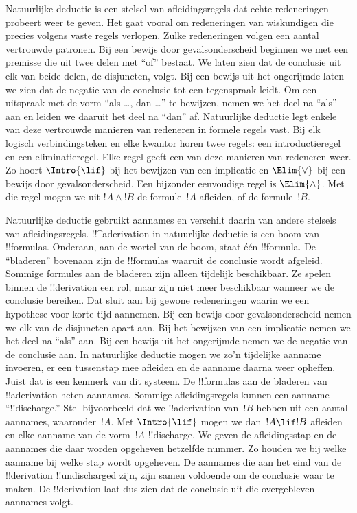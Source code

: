 \documentclass[../../../include/open-logic-section]{subfiles}
\begin{document}
      {}
      {}


Natuurlijke deductie is een stelsel van afleidingsregels dat echte
redeneringen probeert weer te geven. Het gaat vooral om redeneringen
van wiskundigen die precies volgens vaste regels verlopen. Zulke
redeneringen volgen een aantal vertrouwde patronen. Bij een bewijs door
gevalsonderscheid beginnen we met een premisse die uit twee delen met
``of'' bestaat. We laten zien dat de conclusie uit elk van beide delen,
de disjuncten, volgt. Bij een bewijs uit het ongerijmde laten we zien
dat de negatie van de conclusie tot een tegenspraak leidt. Om een
uitspraak met de vorm ``als \dots, dan \dots'' te bewijzen, nemen we
het deel na ``als'' aan en leiden we daaruit het deel na ``dan'' af.
Natuurlijke deductie legt enkele van deze vertrouwde manieren van
redeneren in formele regels vast. Bij elk logisch verbindingsteken en
elke kwantor horen twee regels: een introductieregel en een
eliminatieregel. Elke regel geeft een van deze manieren van
redeneren weer. Zo hoort $\Intro{\lif}$ bij het bewijzen van een
implicatie en $\Elim{\lor}$ bij een bewijs door gevalsonderscheid. Een
bijzonder eenvoudige regel is $\Elim{\land}$. Met die regel mogen we
uit $!A \land !B$ de formule~$!A$ afleiden, of de formule~$!B$.

Natuurlijke deductie gebruikt aannames en verschilt daarin van andere
stelsels van afleidingsregels. !!^a{derivation} in natuurlijke deductie
is een boom van !!{formula}s. Onderaan, aan de wortel van de boom,
staat één !!{formula}. De ``bladeren'' bovenaan zijn de !!{formula}s
waaruit de conclusie wordt afgeleid. Sommige formules aan de bladeren
zijn alleen tijdelijk beschikbaar. Ze spelen binnen de !!{derivation}
een rol, maar zijn niet meer beschikbaar wanneer we de conclusie
bereiken. Dat sluit aan bij gewone redeneringen waarin we een hypothese
voor korte tijd aannemen. Bij een bewijs door gevalsonderscheid nemen
we elk van de disjuncten apart aan. Bij het bewijzen van een
implicatie nemen we het deel na ``als'' aan. Bij een bewijs uit het
ongerijmde nemen we de negatie van de conclusie aan. In natuurlijke
deductie mogen we zo'n tijdelijke aanname invoeren, er een tussenstap
mee afleiden en de aanname daarna weer opheffen. Juist dat is een
kenmerk van dit systeem. De !!{formula}s aan de bladeren van
!!a{derivation} heten aannames. Sommige afleidingsregels kunnen een
aanname ``!!{discharge}.'' Stel bijvoorbeeld dat we !!a{derivation}
van~$!B$ hebben uit een aantal aannames, waaronder~$!A$. Met
$\Intro{\lif}$ mogen we dan~$!A \lif !B$ afleiden en elke aanname van
de vorm~$!A$ !!{discharge}. We geven de afleidingsstap en de aannames
die daar worden opgeheven hetzelfde nummer. Zo houden we bij welke
aanname bij welke stap wordt opgeheven. De aannames die aan het eind
van de !!{derivation} !!{undischarged} zijn, zijn samen voldoende om
de conclusie waar te maken. De !!{derivation} laat dus zien dat de
conclusie uit die overgebleven aannames volgt.
\end{document}
